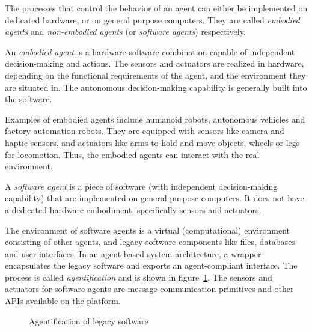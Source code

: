 The processes that control the behavior of an agent can either be implemented on dedicated hardware, or on general purpose
computers. They are called {\em embodied agents} and {\em non-embodied agents} (or {\em software agents}) respectively. 

\begin{definition}
	An {\em embodied agent} is a hardware-software combination capable of independent decision-making and actions. 
	The sensors and actuators are realized in hardware, depending on the functional requirements of the agent, and 
	the environment they are situated in. The autonomous decision-making capability is generally built into the software. 
\end{definition}

\noindent
Examples of embodied agents include humanoid robots, autonomous vehicles and factory automation robots. They are equipped with 
sensors like camera and haptic sensors, and actuators like arms to hold and move objects, wheels or legs for locomotion. Thus,
the embodied agents can interact with the real environment.

 
\begin{definition} 
	A {\em software agent} is a piece of software (with independent decision-making capability) that are implemented on 
	general purpose computers. It does not have a dedicated hardware embodiment, specifically sensors and actuators. 
\end{definition}

The environment of software agents is a virtual (computational) environment consisting of other agents, and legacy software 
components like files, databases and user interfaces. In an agent-based system architecture, a wrapper encapsulates the legacy 
software and exports an agent-compliant interface. The process is called {\em agentification} and is shown in 
figure~\ref{fig:agents:agentification}. The sensors and actuators for software agents are message communication primitives and 
other APIs available on the platform. 

\begin{figure}[!htbp]
	\centering
	\caption{Agentification of legacy software}
	\label{fig:agents:agentification}
\end{figure}

